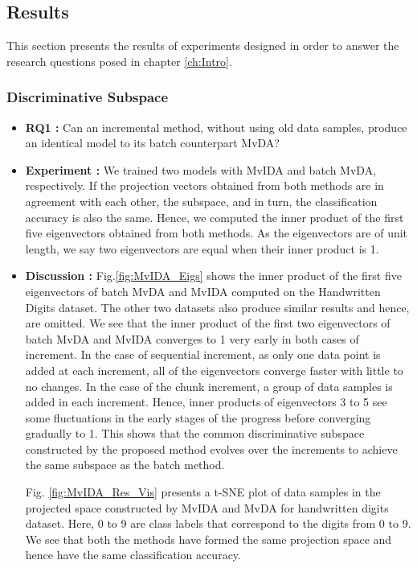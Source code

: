 \subsection{Results}
\label{subs:MvIDA_Res}
This section presents the results of experiments designed in order to answer the research questions posed in chapter \ref{ch:Intro}.

\subsubsection{Discriminative Subspace}
\label{ssubs:MvIDA_Subspace}

\begin{itemize}
\item \textbf{RQ1 :}
Can an incremental method, without using old data samples, produce an identical model to its batch counterpart MvDA?

\item \textbf{Experiment :}
We trained two models with MvIDA and batch MvDA, respectively. If the projection vectors obtained from both methods are in agreement with each other, the subspace, and in turn, the classification accuracy is also the same. Hence, we computed the inner product of the first five eigenvectors obtained from both methods. As the eigenvectors are of unit length, we say two eigenvectors are equal when their inner product is 1.

\item \textbf{Discussion :}
Fig.\ref{fig:MvIDA_Eigs} shows the inner product of the first five eigenvectors of batch MvDA and MvIDA computed on the Handwritten Digits dataset. The other two datasets also produce similar results and hence, are omitted. We see that the inner product of the first two eigenvectors of batch MvDA and MvIDA converges to 1 very early in both cases of increment. In the case of sequential increment, as only one data point is added at each increment, all of the eigenvectors converge faster with little to no changes. In the case of the chunk increment, a group of data samples is added in each increment. Hence, inner products of eigenvectors 3 to 5 see some fluctuations in the early stages of the progress before converging gradually to 1. This shows that the common discriminative subspace constructed by the proposed method evolves over the increments to achieve the same subspace as the batch method.

Fig. \ref{fig:MvIDA_Res_Vis} presents a t-SNE plot \cite{MaatenH08} of data samples in the projected space constructed by MvIDA and MvDA for handwritten digits dataset. Here, 0 to 9 are class labels that correspond to the digits from 0 to 9. We see that both the methods have formed the same projection space and hence have the same classification accuracy.
\end{itemize}


